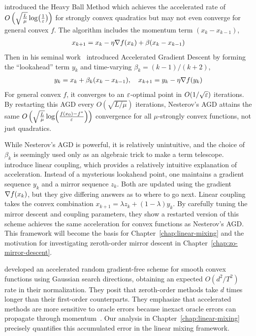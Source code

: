 \citet{polyak1964some} introduced the Heavy Ball Method which achieves the accelerated rate of $O\left(\sqrt{\frac{L}{\mu}} \log(\frac{1}{\varepsilon})\right)$ for strongly convex quadratics but may not even converge for general convex $f$. The algorithm includes the momentum term $(x_k - x_{k-1})$,
\begin{align*}
    x_{k+1} = x_k - \eta \nabla f(x_k) + \beta(x_k - x_{k-1})
\end{align*}
Then in his seminal work~\citet{nesterov1983method} introduced Accelerated Gradient Descent by forming the ``lookahead'' term $y_k$ and time-varying $\beta_k = (k-1)/(k+2)$,
\begin{align*}
    y_k = x_k + \beta_k (x_k - x_{k-1}), \quad x_{k+1} = y_k - \eta \nabla f(y_k)
\end{align*}
For general convex $f$, it converges to an $\varepsilon$-optimal point in $O(1/\sqrt{\varepsilon})$ iterations. By restarting this AGD every $O(\sqrt{L/\mu})$ iterations, Nesterov's AGD attains the same $O\left(\sqrt{\frac{L}{\mu}} \log(\frac{f(x_0) - f^*}{\varepsilon})\right)$ convergence for all $\mu$-strongly convex functions, not just quadratics. 

While Nesterov's AGD is powerful, it is relatively unintuitive, and the choice of $\beta_k$ is seemingly used only as an algebraic trick to make a term telescope. \citet{allenZhu2016linear} introduce linear coupling, which provides a relatively intuitive explanation of acceleration. Instead of a mysterious lookahead point, one maintains a gradient sequence $y_k$ and a mirror sequence $z_k$. Both are updated using the gradient $\nabla f(x_k)$, but they give differing answers as to where to go next. Linear coupling takes the convex combination $x_{k+1} = \lambda z_k + (1-\lambda) y_k$. By carefully tuning the mirror descent and coupling parameters, they show a restarted version of this scheme achieves the same acceleration for convex functions as Nesterov's AGD. This framework will become the basis for Chapter~\ref{chap:linear-mixing} and the motivation for investigating zeroth-order mirror descent in Chapter~\ref{chap:zo-mirror-descent}.

\citet{nesterov2017random} developed an accelerated random gradient-free scheme for smooth convex functions using Gaussian search directions, obtaining an expected $O(d^2/T^2)$ rate in their normalization. They posit that zeroth-order methods take $d$ times longer than their first-order counterparts. They emphasize that accelerated methods are more sensitive to oracle errors because inexact oracle errors can propagate through momentum~\citep{devolder2014first}. Our analysis in Chapter~\ref{chap:linear-mixing} precisely quantifies this accumulated error in the linear mixing framework.

